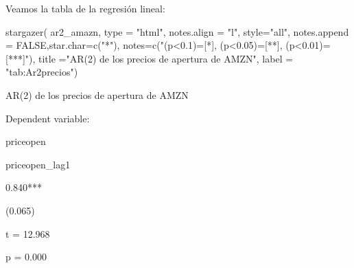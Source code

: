 \documentclass[
]{book}
\newenvironment{Shaded}{\begin{snugshade}}{\end{snugshade}}
\newcommand{\AttributeTok}[1]{\textcolor[rgb]{0.77,0.63,0.00}{#1}}
\newcommand{\ConstantTok}[1]{\textcolor[rgb]{0.00,0.00,0.00}{#1}}
\newcommand{\DecValTok}[1]{\textcolor[rgb]{0.00,0.00,0.81}{#1}}
\newcommand{\FunctionTok}[1]{\textcolor[rgb]{0.00,0.00,0.00}{#1}}
\newcommand{\NormalTok}[1]{#1}
\newcommand{\OtherTok}[1]{\textcolor[rgb]{0.56,0.35,0.01}{#1}}
\newcommand{\SpecialCharTok}[1]{\textcolor[rgb]{0.00,0.00,0.00}{#1}}
\newcommand{\StringTok}[1]{\textcolor[rgb]{0.31,0.60,0.02}{#1}}
\begin{document}
\begin{Shaded}
\end{Shaded}

Veamos la tabla de la regresión lineal:

\begin{Shaded}
\begin{Highlighting}[]
\FunctionTok{stargazer}\NormalTok{(}
\NormalTok{  ar2\_amazn,}
  \AttributeTok{type =} \StringTok{"html"}\NormalTok{,}
  \AttributeTok{notes.align =} \StringTok{"l"}\NormalTok{, }\AttributeTok{style=}\StringTok{"all"}\NormalTok{, }\AttributeTok{notes.append =} \ConstantTok{FALSE}\NormalTok{,}\AttributeTok{star.char=}\FunctionTok{c}\NormalTok{(}\StringTok{"*"}\NormalTok{), }\AttributeTok{notes=}\FunctionTok{c}\NormalTok{(}\StringTok{"(p\textless{}0.1)=[*], (p\textless{}0.05)=[**], (p\textless{}0.01)=[***]"}\NormalTok{), }\AttributeTok{title =}\StringTok{"AR(2) de los precios de apertura de AMZN"}\NormalTok{, }\AttributeTok{label =} \StringTok{"tab:Ar2precios"}\NormalTok{)}
\end{Highlighting}
\end{Shaded}

AR(2) de los precios de apertura de AMZN

Dependent variable:

priceopen

priceopen\_lag1

0.840***

(0.065)

t = 12.968

p = 0.000
\end{document}
